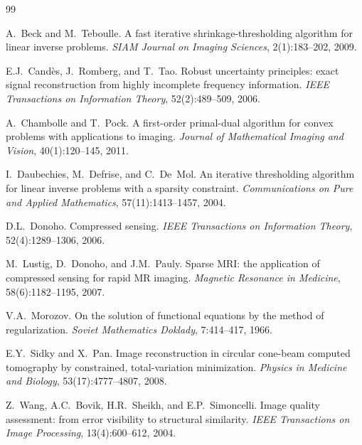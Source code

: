 \documentclass[11pt,a4paper]{article}
\begin{document}
\begin{thebibliography}{99}

A.~Beck and M.~Teboulle.
\newblock A fast iterative shrinkage-thresholding algorithm for linear
  inverse problems.
\newblock \emph{SIAM Journal on Imaging Sciences}, 2(1):183--202, 2009.

E.J.~Cand\`es, J.~Romberg, and T.~Tao.
\newblock Robust uncertainty principles: exact signal reconstruction from
  highly incomplete frequency information.
\newblock \emph{IEEE Transactions on Information Theory}, 52(2):489--509,
  2006.

A.~Chambolle and T.~Pock.
\newblock A first-order primal-dual algorithm for convex problems with
  applications to imaging.
\newblock \emph{Journal of Mathematical Imaging and Vision}, 40(1):120--145,
  2011.

I.~Daubechies, M.~Defrise, and C.~De~Mol.
\newblock An iterative thresholding algorithm for linear inverse problems
  with a sparsity constraint.
\newblock \emph{Communications on Pure and Applied Mathematics},
  57(11):1413--1457, 2004.

D.L.~Donoho.
\newblock Compressed sensing.
\newblock \emph{IEEE Transactions on Information Theory}, 52(4):1289--1306,
  2006.

M.~Lustig, D.~Donoho, and J.M.~Pauly.
\newblock Sparse MRI: the application of compressed sensing for rapid MR
  imaging.
\newblock \emph{Magnetic Resonance in Medicine}, 58(6):1182--1195, 2007.

V.A.~Morozov.
\newblock On the solution of functional equations by the method of
  regularization.
\newblock \emph{Soviet Mathematics Doklady}, 7:414--417, 1966.

E.Y.~Sidky and X.~Pan.
\newblock Image reconstruction in circular cone-beam computed tomography by
  constrained, total-variation minimization.
\newblock \emph{Physics in Medicine and Biology}, 53(17):4777--4807, 2008.

Z.~Wang, A.C.~Bovik, H.R.~Sheikh, and E.P.~Simoncelli.
\newblock Image quality assessment: from error visibility to structural
  similarity.
\newblock \emph{IEEE Transactions on Image Processing}, 13(4):600--612, 2004.

\end{thebibliography}
\end{document}
